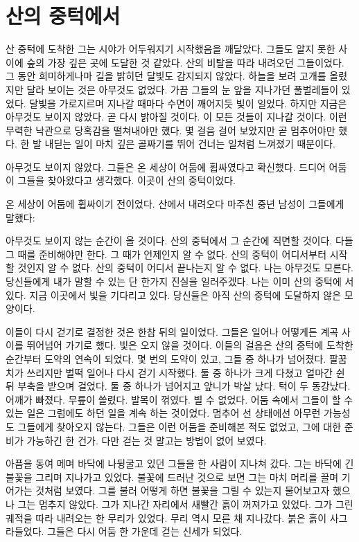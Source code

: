 \begin{article}
\hypertarget{uxc0b0uxc758-uxc911uxd131uxc5d0uxc11c}{%
\chapter{산의 중턱에서}\label{uxc0b0uxc758-uxc911uxd131uxc5d0uxc11c}}

산 중턱에 도착한 그는 시야가 어두워지기 시작했음을 깨달았다. 그들도 알지 못한 사이에 숲의 가장 깊은 곳에 도달한 것 같았다. 산의 비탈을 따라 내려오던 그들이었다. 그 동안 희미하게나마 길을 밝히던 달빛도 감지되지 않았다. 하늘을 보려 고개를 올렸지만 달라 보이는 것은 아무것도 없었다. 가끔 그들의 눈 앞을 지나가던 풀벌레들이 있었다. 달빛을 가로지르며 지나갈 때마다 수면이 깨어지듯 빛이 일었다. 하지만 지금은 아무것도 보이지 않았다. 곧 다시 밝아질 것이다. 이 모든 것들이 지나갈 것이다. 이런 무력한 낙관으로 당혹감을 떨쳐내야만 했다. 몇 걸음 걸어 보았지만 곧 멈추어야만 했다. 한 발 내딛는 일이 마치 깊은 골짜기를 뛰어 건너는 일처럼 느껴졌기 때문이다.

아무것도 보이지 않았다. 그들은 온 세상이 어둠에 휩싸였다고 확신했다. 드디어 어둠이 그들을 찾아왔다고 생각했다. 이곳이 산의 중턱이었다.

온 세상이 어둠에 휩싸이기 전이었다. 산에서 내려오다 마주친 중년 남성이 그들에게 말했다:

아무것도 보이지 않는 순간이 올 것이다. 산의 중턱에서 그 순간에 직면할 것이다. 다들 그 때를 준비해야만 한다. 그 때가 언제인지 알 수 없다. 산의 중턱이 어디서부터 시작할 것인지 알 수 없다. 산의 중턱이 어디서 끝나는지 알 수 없다. 나는 아무것도 모른다. 당신들에게 내가 말할 수 있는 단 한가지 진실을 일러주겠다. 나는 이미 산의 중턱에 서 있다. 지금 이곳에서 빛을 기다리고 있다. 당신들은 아직 산의 중턱에 도달하지 않은 모양이다.

이들이 다시 걷기로 결정한 것은 한참 뒤의 일이었다. 그들은 일어나 어떻게든 계곡 사이를 뛰어넘어 가기로 했다. 빛은 오지 않을 것이다. 이들의 걸음은 산의 중턱에 도착한 순간부터 도약의 연속이 되었다. 몇 번의 도약이 있고, 그들 중 하나가 넘어졌다. 팔꿈치가 쓰리지만 벌떡 일어나 다시 걷기 시작했다. 둘 중 하나가 크게 다쳤고 얼마간 쉰 뒤 부축을 받으며 걸었다. 둘 중 하나가 넘어지고 앞니가 박살 났다. 턱이 두 동강났다. 어깨가 빠졌다. 무릎이 쓸렸다. 발목이 꺾였다. 별 수 없었다. 어둠 속에서 그들이 할 수 있는 일은 그럼에도 하던 일을 계속 하는 것이었다. 멈추어 선 상태에선 아무런 가능성도 그들에게 찾아오지 않는다. 그들은 이런 어둠을 준비해본 적도 없었고, 그에 대한 준비가 가능하긴 한 건가. 다만 걷는 것 말고는 방법이 없어 보였다.

아픔을 동여 메며 바닥에 나뒹굴고 있던 그들을 한 사람이 지나쳐 갔다. 그는 바닥에 긴 불꽃을 그리며 지나가고 있었다. 불꽃에 드러난 것으로 보면 그는 마치 머리를 끌며 기어가는 것처럼 보였다. 그를 불러 어떻게 하면 불꽃을 그릴 수 있는지 물어보고자 했으나 그는 멈추지 않았다. 그가 지나간 자리에서 새빨간 흙이 꺼져가고 있었다. 그가 그린 궤적을 따라 내려오는 한 무리가 있었다. 무리 역시 모른 채 지나갔다. 붉은 흙이 사그라들었다. 그들은 다시 어둠 한 가운데 걷는 신세가 되었다.


\end{article}
